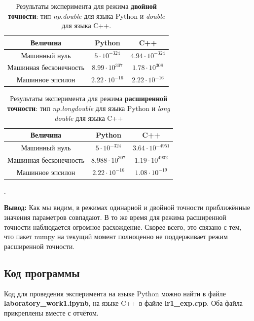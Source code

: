 \documentclass[12pt]{article}%
\begin{document}
\begin{table}[h]
\centering
\begin{tabular}{|c|c|c|}
\hline Величина  &  Python  &  C++ \\
\hline Машинный нуль        
    & $5 \cdot 10^{-324}$ & $4.94 \cdot 10^{-324}$ \\
\hline Машинная бесконечность
    & $8.99 \cdot 10^{307}$ & $1.78 \cdot 10^{308}$ \\
\hline Машинное эпсилон
    & $2.22 \cdot 10^{-16}$ & $2.22 \cdot 10^{-16}$ \\
\hline
    \end{tabular}
    \caption{Результаты эксперимента для режима \textbf{двойной точности}: тип \textit{np.double} для языка Python и \textit{double} для языка C++.}
\end{table}

\begin{table}[h]
    \centering
\begin{tabular}{|c|c|c|}
\hline Величина &  Python  &  C++ \\
\hline Машинный нуль
    & $5 \cdot 10^{-324}$ & $3.64 \cdot 10^{-4951}$ \\
\hline Машинная бесконечность
    & $8.988 \cdot 10^{307}$ & $1.19 \cdot 10^{4932}$ \\
\hline Машинное эпсилон
    & $2.22 \cdot 10^{-16}$ & $1.08 \cdot 10^{-19}$ \\
\hline
\end{tabular}

\caption{Результаты эксперимента для режима \textbf{расширенной точности}:
тип \textit{np.longdouble} для языка Python и \textit{long double} для языка C++}.
\end{table}

\newpage
\textbf{Вывод:} Как мы видим, в режимах одинарной и двойной точности приближённые значения параметров совпадают. В то же время для режима расширенной точности наблюдается огромное расхождение. Скорее всего, это связано с тем, что пакет numpy на текущий момент полноценно не поддерживает режим расширенной точности.

\subsection{Код программы}
Код для проведения эксперимента на языке Python можно найти в файле \textbf{laboratory\_work1.ipynb}, на языке C++ в файле \textbf{lr1\_exp.cpp}. Оба файла прикреплены вместе с отчётом.

\newpage
\end{document}
